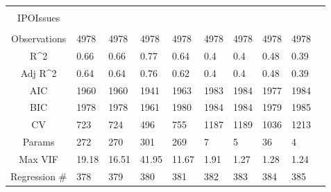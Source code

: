 \documentclass{article}
\begin{document}
\begin{table}[H]
\begin{tabular}{|clllllllll|}
   &  &  &  &  &  &  &  &  & \\ 
  IPOIssues &  &  &  &  &  &  &  &  & \\ 
   &  &  &  &  &  &  &  &  & \\ 
  \hline 
 Observations & 4978 & 4978 & 4978 & 4978 & 4978 & 4978 & 4978 & 4978 & \\ 
  R^2 & 0.66 & 0.66 & 0.77 & 0.64 & 0.4 & 0.4 & 0.48 & 0.39 & \\ 
  Adj R^2 & 0.64 & 0.64 & 0.76 & 0.62 & 0.4 & 0.4 & 0.48 & 0.39 & \\ 
  AIC & 1960 & 1960 & 1941 & 1963 & 1983 & 1984 & 1977 & 1984 & \\ 
  BIC & 1978 & 1978 & 1961 & 1980 & 1984 & 1984 & 1979 & 1985 & \\ 
  CV & 723 & 724 & 496 & 755 & 1187 & 1189 & 1036 & 1213 & \\ 
  Params & 272 & 270 & 301 & 269 & 7 & 5 & 36 & 4 & \\ 
  Max VIF & 19.18 & 16.51 & 41.95 & 11.67 & 1.91 & 1.27 & 1.28 & 1.24 & \\ 
  Regression \# & 378 & 379 & 380 & 381 & 382 & 383 & 384 & 385 & \\ 
   \hline
\end{tabular}
 
\end{table}
\end{document}
